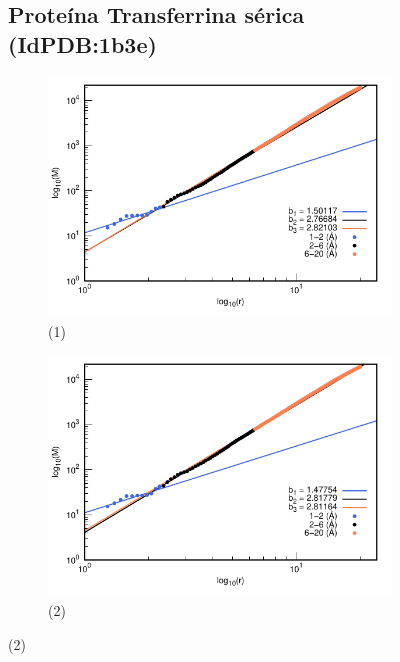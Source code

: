 \begin{figure}[H]
	\subsection*{Proteína Transferrina s\'{e}rica (IdPDB:1b3e)}
	
	\hspace{-0.3cm} 
	\begin{subfigure}{0.49\textwidth}
		\centering
		\includegraphics[width=\linewidth,page=1]{graphs/PDBs/1b3e/1b3eaddH.pdf}
		\caption{(1)}
	\end{subfigure}
	\hspace{0.2cm}
	\begin{subfigure}{0.49\textwidth}
		\centering
		\includegraphics[width=\linewidth,page=1]{graphs/PDBs/1b3e/1b3eEm.pdf}
		\caption{(2)}
	\end{subfigure}
	

\end{figure}
